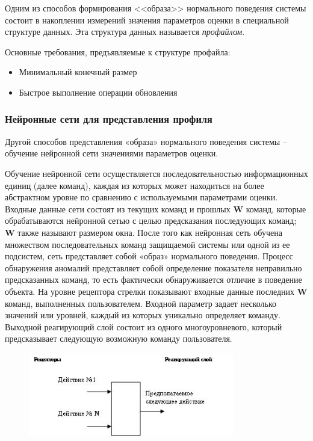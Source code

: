 Одним из способов формирования <<образа>> нормального поведения системы состоит в 
накоплении измерений значения параметров оценки в специальной структуре данных. 
Эта структура данных называется \textit{профайлом}. 

Основные требования, предъявляемые к структуре профайла:
\begin{itemize}
	\item Минимальный конечный размер
	
	\item Быстрое выполнение операции обновления
\end{itemize}



\subsubsection{Нейронные сети для представления профиля}
Другой способов представления «образа» нормального поведения системы – обучение нейронной 
сети значениями параметров оценки.

Обучение нейронной сети осуществляется последовательностью информационных единиц (далее команд), 
каждая из которых может находиться на более абстрактном уровне по сравнению с используемыми 
параметрами оценки. Входные данные сети состоят из текущих команд и прошлых \textbf{W} команд, которые 
обрабатываются нейронной сетью с целью предсказания последующих команд; \textbf{W} также называют размером
окна. После того как нейронная сеть обучена множеством последовательных команд защищаемой системы или 
одной из ее подсистем, сеть представляет собой «образ» нормального поведения. Процесс обнаружения 
аномалий представляет собой определение показателя неправильно предсказанных команд, 
то есть фактически обнаруживается отличие в поведение объекта. На уровне рецептора стрелки 
показывают входные данные последних \textbf{W} команд, выполненных пользователем. Входной параметр задает 
несколько значений или уровней, каждый из которых уникально определяет команду. Выходной реагирующий 
слой состоит из одного многоуровневого, который предсказывает следующую возможную команду пользователя.

\begin{figure}[h!]
    \centering
    \includegraphics[width=0.8\textwidth]{assets/intrusion/нейронные сети.jpg}
\end{figure}

